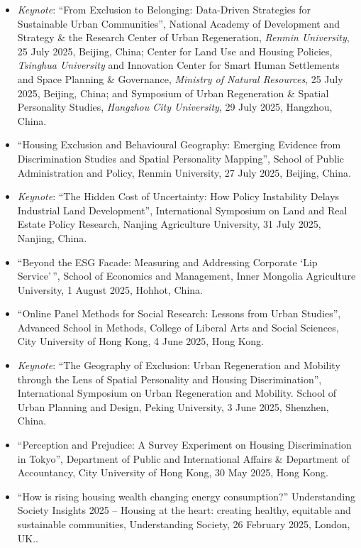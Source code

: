\documentclass[11pt,a4paper]{article}
\providecommand{\tightlist}{%
  \setlength{\itemsep}{1pt}\setlength{\parskip}{0pt}}
\begin{document}
\begin{itemize}
\tightlist
\item
  \emph{Keynote}: ``From Exclusion to Belonging: Data-Driven Strategies
  for Sustainable Urban Communities'', National Academy of Development
  and Strategy \& the Research Center of Urban Regeneration,
  \emph{Renmin University}, 25 July 2025, Beijing, China; Center for
  Land Use and Housing Policies, \emph{Tsinghua University} and
  Innovation Center for Smart Human Settlements and Space Planning \&
  Governance, \emph{Ministry of Natural Resources}, 25 July 2025,
  Beijing, China; and Symposium of Urban Regeneration \& Spatial
  Personality Studies, \emph{Hangzhou City University}, 29 July 2025,
  Hangzhou, China.
\item
  ``Housing Exclusion and Behavioural Geography: Emerging Evidence from
  Discrimination Studies and Spatial Personality Mapping'', School of
  Public Administration and Policy, Renmin University, 27 July 2025,
  Beijing, China.
\item
  \emph{Keynote}: ``The Hidden Cost of Uncertainty: How Policy
  Instability Delays Industrial Land Development'', International
  Symposium on Land and Real Estate Policy Research, Nanjing Agriculture
  University, 31 July 2025, Nanjing, China.
\item
  ``Beyond the ESG Facade: Measuring and Addressing Corporate `Lip
  Service'\,'', School of Economics and Management, Inner Mongolia
  Agriculture University, 1 August 2025, Hohhot, China.
\item
  ``Online Panel Methods for Social Research: Lessons from Urban
  Studies'', Advanced School in Methods, College of Liberal Arts and
  Social Sciences, City University of Hong Kong, 4 June 2025, Hong Kong.
\item
  \emph{Keynote}: ``The Geography of Exclusion: Urban Regeneration and
  Mobility through the Lens of Spatial Personality and Housing
  Discrimination'', International Symposium on Urban Regeneration and
  Mobility. School of Urban Planning and Design, Peking University, 3
  June 2025, Shenzhen, China.
\item
  ``Perception and Prejudice: A Survey Experiment on Housing
  Discrimination in Tokyo'', Department of Public and International
  Affairs \& Department of Accountancy, City University of Hong Kong, 30
  May 2025, Hong Kong.
\item
  ``How is rising housing wealth changing energy consumption?''
  Understanding Society Insights 2025 -- Housing at the heart: creating
  healthy, equitable and sustainable communities, Understanding Society,
  26 February 2025, London, UK..
\end{itemize}
\end{document}

